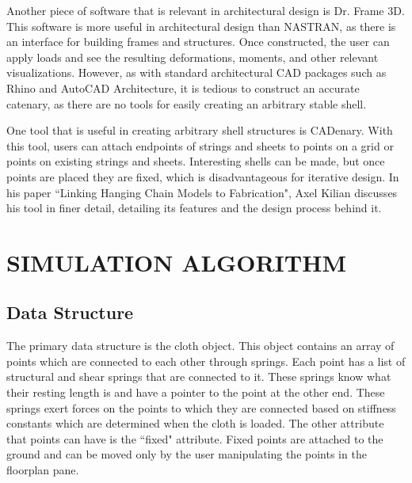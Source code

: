 \documentclass{thesis}
\begin{document}
Another piece of software that is relevant in architectural design is Dr. Frame 3D\cite{drframe}.  This
software is more useful in architectural design than NASTRAN, as there is an interface for building frames and structures.
Once constructed, the user can apply loads and see the resulting deformations, moments, and other relevant
visualizations.  However, as with standard architectural CAD packages such as Rhino\cite{rhino} and
AutoCAD Architecture\cite{autocad}, it is tedious to construct an accurate catenary, as there are no
tools for easily creating an arbitrary stable shell.

One tool that is useful in creating arbitrary shell structures is CADenary\cite{cadenary}.  With this tool,
users can attach endpoints of strings and sheets to points on a grid or points on existing strings and sheets.
Interesting shells can be made, but once points are placed they are fixed, which is disadvantageous for
iterative design.  In his paper ``Linking Hanging Chain Models to Fabrication"\cite{kilian05cadenary}, Axel Kilian
discusses his tool in finer detail, detailing its features and the design process behind it.


\chapter{SIMULATION ALGORITHM}
\section{Data Structure}
The primary data structure is the cloth object.  This object contains an array of points which are connected to each other through springs.
Each point has a list of structural and shear springs that are connected to it.  These springs know what their resting length is and have
a pointer to the point at the other end.  These springs exert forces on the points to which they are connected based on stiffness constants
which are determined when the cloth is loaded.  The other attribute that points can have is the ``fixed" attribute.  Fixed points are
attached to the ground and can be moved only by the user manipulating the points in the floorplan pane.
\end{document}
